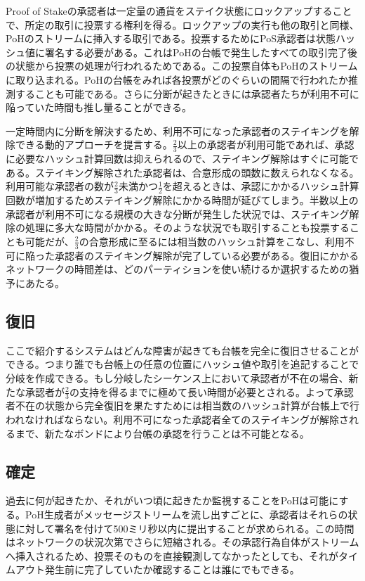\documentclass[12pt]{ltjsarticle}
\begin{document}
Proof of Stakeの承認者は一定量の通貨をステイク状態にロックアップすることで、所定の取引に投票する権利を得る。ロックアップの実行も他の取引と同様、PoHのストリームに挿入する取引である。投票するためにPoS承認者は状態ハッシュ値に署名する必要がある。これはPoHの台帳で発生したすべての取引完了後の状態から投票の処理が行われるためである。この投票自体もPoHのストリームに取り込まれる。PoHの台帳をみれば各投票がどのぐらいの間隔で行われたか推測することも可能である。さらに分断が起きたときには承認者たちが利用不可に陥っていた時間も推し量ることができる。

一定時間内に分断を解決するため、利用不可になった承認者のステイキングを解除できる動的アプローチを提言する。\(\frac{2}{3}\)以上の承認者が利用可能であれば、承認に必要なハッシュ計算回数は抑えられるので、ステイキング解除はすぐに可能である。ステイキング解除された承認者は、合意形成の頭数に数えられなくなる。利用可能な承認者の数が\(\frac{2}{3}\)未満かつ\(\frac{1}{2}\)を超えるときは、承認にかかるハッシュ計算回数が増加するためステイキング解除にかかる時間が延びてしまう。半数以上の承認者が利用不可になる規模の大きな分断が発生した状況では、ステイキング解除の処理に多大な時間がかかる。そのような状況でも取引することも投票することも可能だが、\(\frac{2}{3}\)の合意形成に至るには相当数のハッシュ計算をこなし、利用不可に陥った承認者のステイキング解除が完了している必要がある。復旧にかかるネットワークの時間差は、どのパーティションを使い続けるか選択するための猶予にあたる。

\subsection{復旧}\label{availability}
ここで紹介するシステムはどんな障害が起きても台帳を完全に復旧させることができる。つまり誰でも台帳上の任意の位置にハッシュ値や取引を追記することで分岐を作成できる。もし分岐したシーケンス上において承認者が不在の場合、新たな承認者が\(\frac{2}{3}\)の支持を得るまでに極めて長い時間が必要とされる。よって承認者不在の状態から完全復旧を果たすためには相当数のハッシュ計算が台帳上で行われなければならない。利用不可になった承認者全てのステイキングが解除されるまで、新たなボンドにより台帳の承認を行うことは不可能となる。

\subsection{確定}\label{availability}
過去に何が起きたか、それがいつ頃に起きたか監視することをPoHは可能にする。PoH生成者がメッセージストリームを流し出すごとに、承認者はそれらの状態に対して署名を付けて500ミリ秒以内に提出することが求められる。この時間はネットワークの状況次第でさらに短縮される。その承認行為自体がストリームへ挿入されるため、投票そのものを直接観測してなかったとしても、それがタイムアウト発生前に完了していたか確認することは誰にでもできる。
\end{document}
